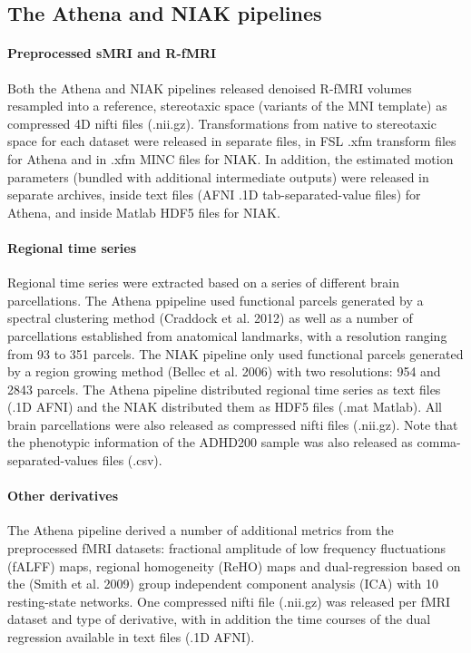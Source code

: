 \documentclass[preprint,12pt,1p]{elsarticle}
\begin{document}
\subsection{The Athena and NIAK pipelines}

\paragraph{Preprocessed sMRI and R-fMRI} Both the Athena and NIAK pipelines released denoised R-fMRI volumes resampled into a reference, stereotaxic space (variants of the MNI template) as compressed 4D nifti files (.nii.gz). Transformations from native to stereotaxic space for each dataset were released in separate files, in FSL .xfm transform files for Athena and in .xfm MINC files for NIAK. In addition, the estimated motion parameters (bundled with additional intermediate outputs) were released in separate archives, inside text files (AFNI .1D tab-separated-value files) for Athena, and inside Matlab HDF5 files for NIAK. 


\paragraph{Regional time series} Regional time series were extracted based on a series of different brain parcellations. The Athena ppipeline used functional parcels generated by a spectral clustering method (Craddock et al. 2012) as well as a number of parcellations established from anatomical landmarks, with a resolution ranging from 93 to 351 parcels. The NIAK pipeline only used functional parcels generated by a region growing method (Bellec et al. 2006) with two resolutions: 954 and 2843 parcels. The Athena pipeline distributed regional time series as text files (.1D AFNI) and the NIAK distributed them as HDF5 files (.mat Matlab). All brain parcellations were also released as compressed nifti files (.nii.gz). Note that the phenotypic information of the ADHD200 sample was also released as comma-separated-values files (.csv). 

\paragraph{Other derivatives}
The Athena pipeline derived a number of additional metrics from the preprocessed fMRI datasets: fractional amplitude of low frequency fluctuations (fALFF) maps, regional homogeneity (ReHO) maps and dual-regression based on the (Smith et al. 2009) group independent component analysis (ICA) with 10 resting-state networks. One compressed nifti file (.nii.gz) was released per fMRI dataset and type of derivative, with in addition the time courses of the dual regression available in text files (.1D AFNI).
\end{document}
